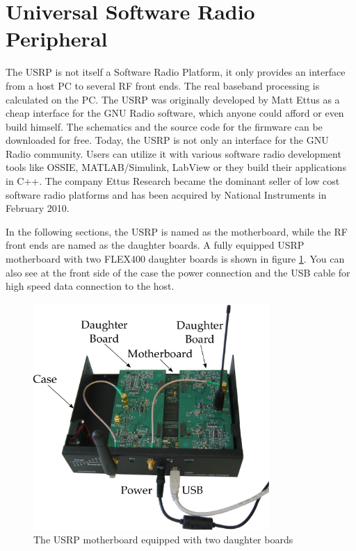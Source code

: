 \section{Universal Software Radio Peripheral}
\label{sec:USRP}
The \ac{USRP}  is not itself a Software Radio Platform, it only provides an interface from a host \ac{PC} to several RF front ends. The real baseband processing is calculated on the \ac{PC}. The \ac{USRP} was originally developed by Matt Ettus \cite{ettus:website} as a cheap interface for the GNU Radio software, which anyone could afford or even build himself. The schematics and the source code for the firmware can be downloaded for free. Today, the \ac{USRP} is not only an interface for the GNU Radio community. Users can utilize it with various software radio development tools like OSSIE, MATLAB/Simulink, LabView or they build their applications in C++. The company Ettus Research became the dominant seller of low cost software radio platforms and has been acquired by National Instruments in February 2010.

In the following sections, the \ac{USRP} is named as the motherboard, while the RF front ends are named as the daughter boards. A fully equipped USRP motherboard with two FLEX400 daughter boards is shown in figure \ref{fig:USRP_photo}. You can also see at the front side of the case the power connection and the USB cable for high speed data connection to the host.
   
\begin{figure}
	\centering
		\includegraphics[width=0.8\textwidth]{../kapitel03/figures/USRP_DB_small.pdf}
	\caption{The USRP motherboard equipped with two daughter boards}
	\label{fig:USRP_photo}
\end{figure}

